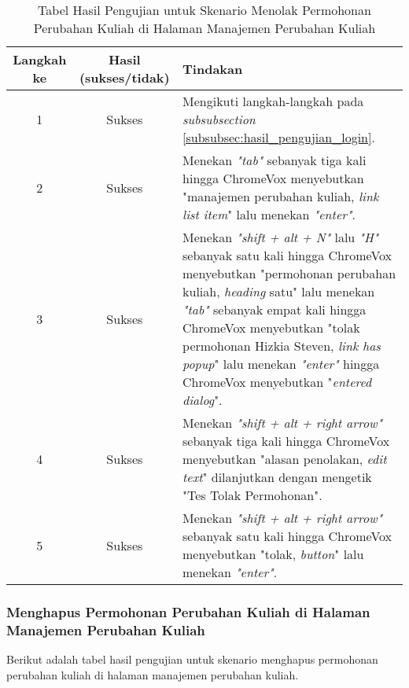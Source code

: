 \begin{table}[H]
    \centering 
    \caption{Tabel Hasil Pengujian untuk Skenario Menolak Permohonan Perubahan Kuliah di Halaman Manajemen Perubahan Kuliah}
    \label{tab:hasil_pengujian_menolak_permohonan_perubahan_kuliah_di_halaman_manajemen_perubahan_kuliah}
    \begin{tabular}{|c|c|p{10cm}|}
        \toprule
        Langkah ke & Hasil (sukses/tidak) & Tindakan \\

        \midrule
        1 & Sukses & Mengikuti langkah-langkah pada \textit{subsubsection} \ref{subsubsec:hasil_pengujian_login}. \\
        2 & Sukses & Menekan \textit{"tab"} sebanyak tiga kali hingga ChromeVox menyebutkan "manajemen perubahan kuliah, \textit{link list item}" lalu menekan \textit{"enter"}. \\
        3 & Sukses & Menekan \textit{"shift + alt + N"} lalu \textit{"H"} sebanyak satu kali hingga ChromeVox menyebutkan "permohonan perubahan kuliah, \textit{heading} satu" lalu menekan \textit{"tab"} sebanyak empat kali hingga ChromeVox menyebutkan "tolak permohonan Hizkia Steven, \textit{link has popup}" lalu menekan \textit{"enter"} hingga ChromeVox menyebutkan "\textit{entered dialog}". \\
        4 & Sukses & Menekan \textit{"shift + alt + right arrow"} sebanyak tiga kali hingga ChromeVox menyebutkan "alasan penolakan, \textit{edit text}" dilanjutkan dengan mengetik "Tes Tolak Permohonan". \\
        5 & Sukses & Menekan \textit{"shift + alt + right arrow"} sebanyak satu kali hingga ChromeVox menyebutkan "tolak, \textit{button}" lalu menekan \textit{"enter"}. \\ 

        \bottomrule

    \end{tabular}
\end{table}

\subsubsection{Menghapus Permohonan Perubahan Kuliah di Halaman Manajemen Perubahan Kuliah}
\label{subsubsec:hasil_pengujian_menghapus_permohonan_perubahan_kuliah_di_halaman_manajemen_perubahan_kuliah}
Berikut adalah tabel hasil pengujian untuk skenario menghapus permohonan perubahan kuliah di halaman manajemen perubahan kuliah.

